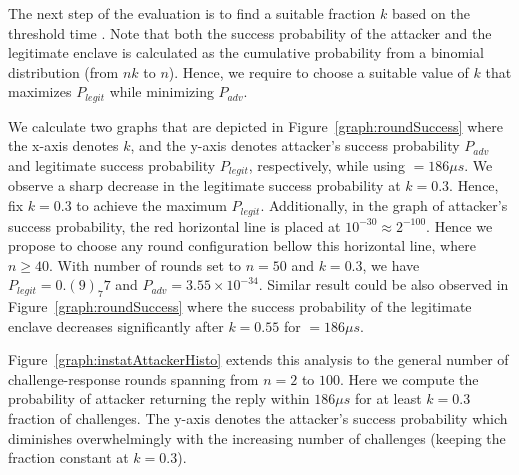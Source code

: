  The next step of the evaluation is to find a suitable fraction $k$ based on the threshold time \connect. Note that both the success probability of the attacker and the legitimate enclave is calculated as the cumulative probability from a binomial distribution (from $nk$ to $n$). Hence, we require to choose a suitable value of $k$ that maximizes $P_{legit}$ while minimizing $P_{adv}$.

We calculate two graphs that are depicted in Figure~\ref{graph:roundSuccess} where the x-axis denotes $k$, and the y-axis denotes attacker's success probability $P_{adv}$ and legitimate success probability $P_{legit}$, respectively, while using \connect$=186 \mu s$. We observe a sharp decrease in the legitimate success probability at $k=0.3$. Hence, fix $k=0.3$ to achieve the maximum $P_{legit}$. Additionally, in the graph of attacker's success probability, the red horizontal line is placed at $10^{-30} \approx 2^{-100}$. Hence we propose to choose any round configuration bellow this horizontal line, where $n \geq 40$. With number of rounds set to $n=50$ and $k=0.3$, we have $P_{legit}=0.(9)_7 7$ and $P_{adv}=3.55\times 10^{-34}$. Similar result could be also observed in Figure~\ref{graph:roundSuccess} where the success probability of the legitimate enclave decreases significantly after $k=0.55$ for \connect$=186\mu s$.



 Figure~\ref{graph:instatAttackerHisto} extends this analysis to the general number of challenge-response rounds spanning from $n=2$ to $100$. Here we compute the probability of attacker returning the reply within $186 \mu s$ for at least $k=0.3$ fraction of challenges. The y-axis denotes the attacker's success probability which diminishes overwhelmingly with the increasing number of challenges (keeping the fraction constant at $k=0.3$). 




